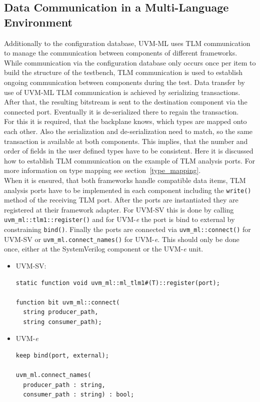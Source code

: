\subsection{Data Communication in a Multi-Language Environment} \label{ml_tlm}
Additionally to the configuration database, UVM-ML uses TLM communication to manage the communication between components
of different frameworks. While communication via the configuration database only occurs once per item to build the
structure of the testbench, TLM communication is used to establish ongoing communication between components during the
test. Data transfer by use of UVM-ML TLM communication is achieved by serializing transactions. After that, the resulting
bitstream is sent to the destination component via the connected port. Eventually it is de-serialized there to regain the transaction.\\
For this it is required, that the backplane knows, which types are mapped onto each other. Also the serialization and
de-serialization need to match, so the same transaction is available at both components. This implies, that the number
and order of fields in the user defined types have to be consistent.
Here it is discussed how to establish TLM communication on the example of TLM analysis ports. For more information on
type mapping see section~\ref{type_mapping}.\\
When it is ensured, that both frameworks handle compatible data items, TLM analysis ports have to be implemented in each
component including the \lstinline$write()$ method of the receiving TLM port. After the ports are instantiated they
are registered at their framework adapter. For UVM-SV this is done by calling
\lstinline$uvm_ml::tlm1::register()$ and for UVM-\textit{e} the port is bind to external by constraining \lstinline$bind()$.
Finally the ports are connected via \lstinline$uvm_ml::connect()$ for UVM-SV or
\lstinline$uvm_ml.connect_names()$ for UVM-\textit{e}. This should only be done once, either at the
SystemVerilog component or the UVM-\textit{e} unit.
\begin{itemize}
\item{UVM-SV:}
{}
\begin{lstlisting}
static function void uvm_ml::ml_tlm1#(T)::register(port);

function bit uvm_ml::connect(
  string producer_path,
  string consumer_path);
\end{lstlisting} 

\item{UVM-\textit{e}}
{}
\begin{lstlisting}
keep bind(port, external);

uvm_ml.connect_names(
  producer_path : string,
  consumer_path : string) : bool;
\end{lstlisting} 
\end{itemize}


